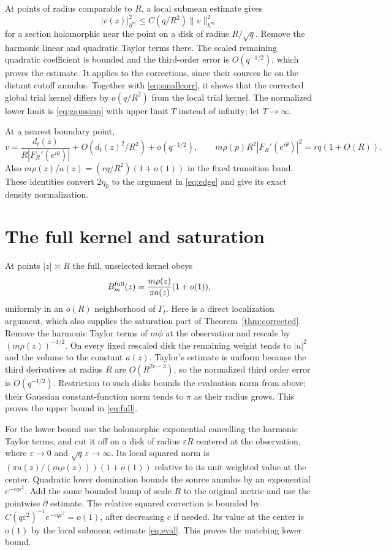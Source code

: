 \documentclass[11pt]{article}
\theoremstyle{remark}\newtheorem{remark}[theorem]{Remark}
\begin{document}
At points of radius comparable to $R$, a local submean estimate gives
\begin{equation}\label{eq:eval}
 |v(z)|_{h^m}^2\leq C(q/R^2)\|v\|_{h^m}^2
\end{equation}
for a section holomorphic near the point on a disk of radius
$R/\sqrt q$. Remove the harmonic linear and quadratic Taylor terms
there. The scaled remaining quadratic coefficient is bounded and the
third-order error is $O(q^{-1/2})$, which proves the estimate.
It applies to the corrections, since their sources lie on the distant
cutoff annulus. Together with \eqref{eq:smallcorr}, it shows that the
corrected global trial kernel differs by $o(q/R^2)$ from the local trial
kernel. The normalized lower limit is \eqref{eq:gaussian} with upper
limit $T$ instead of infinity; let $T\to\infty$.

At a nearest boundary point,
\[
 v=\frac{d_t(z)}{R|F_R'(e^{i\theta})|}
       +O(d_t(z)^2/R^2)+o(q^{-1/2}),\qquad
 m\rho(p)R^2|F_R'(e^{i\theta})|^2=rq(1+O(R)).
\]
Also $m\rho(z)/a(z)=(rq/R^2)(1+o(1))$ in the fixed transition band.
These identities convert $2\eta_0$ to the argument in \eqref{eq:edge}
and give its exact density normalization.

\section{The full kernel and saturation}
At points $|z|\asymp R$ the full, unselected kernel obeys
\begin{equation}\label{eq:full}
 B_m^{\rm full}(z)=\frac{m\rho(z)}{\pi a(z)}(1+o(1)),
\end{equation}
uniformly in an $o(R)$ neighborhood of $\Gamma_t$. Here is a direct
localization argument, which also supplies the saturation part of
Theorem~\ref{thm:corrected}. Remove the harmonic Taylor terms of $m\phi$
at the observation and rescale by $(m\rho(z))^{-1/2}$. On every fixed
rescaled disk the remaining weight tends to $|u|^2$ and the volume to
the constant $a(z)$. Taylor's estimate is uniform because the third
derivatives at radius $R$ are $O(R^{2r-3})$, so the normalized third
order error is $O(q^{-1/2})$. Restriction to such disks bounds the
evaluation norm from above; their Gaussian constant-function norm tends
to $\pi$ as their radius grows. This proves the upper bound in
\eqref{eq:full}.

For the lower bound use the holomorphic exponential cancelling the
harmonic Taylor terms, and cut it off on a disk of radius $\varepsilon R$
centered at the observation, where $\varepsilon\to0$ and
$\sqrt q\,\varepsilon\to\infty$. Its local squared norm is
$(\pi a(z)/(m\rho(z)))(1+o(1))$ relative to its unit weighted value
at the center. Quadratic lower domination bounds the source annulus by
an exponential $e^{-cq\varepsilon^2}$. Add the same bounded bump of
scale $R$ to the original metric and use the pointwise $\bar\partial$
estimate. The relative squared correction is bounded by
$C(q\varepsilon^2)^{-1}e^{-cq\varepsilon^2}=o(1)$, after decreasing
$c$ if needed. Its value at the center is $o(1)$ by the local submean
estimate \eqref{eq:eval}. This proves the matching lower bound.
\end{document}
